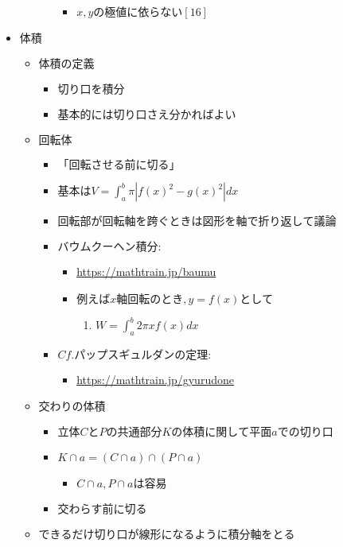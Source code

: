 \documentclass[dvipdfmx,uplatex]{jsarticle}
\begin{document}
\begin{itemize}
\begin{itemize}
\begin{itemize}
\begin{itemize}
				\item $ x,yの極値に依らない [16]$
			\end{itemize}
		\end{itemize}
	\end{itemize}
	\item $ 体積$
	\begin{itemize}
		\item $ 体積の定義$
		\begin{itemize}
			\item $ 切り口を積分$
			\item $ 基本的には切り口さえ分かればよい$
		\end{itemize}
		\item $ 回転体$
		\begin{itemize}
			\item $ 「回転させる前に切る」$
			\item $ 基本はV = \int^b_a \pi |f(x)^2 - g(x)^2|dx$
			\item $ 回転部が回転軸を跨ぐときは図形を軸で折り返して議論$
			\item $ バウムクーヘン積分: $
			\begin{itemize}
				\item \url{https://mathtrain.jp/baumu}
				\item $ 例えばx軸回転のとき,y = f(x)として$
				\begin{enumerate}
					\item $ W = \int^b_a 2\pi xf(x)dx$
				\end{enumerate}
			\end{itemize}
			\item $ Cf. パップスギュルダンの定理: $
			\begin{itemize}
				\item \url{https://mathtrain.jp/gyurudone}
			\end{itemize}
		\end{itemize}
		\item $ 交わりの体積$
		\begin{itemize}
			\item $ 立体CとPの共通部分Kの体積に関して平面aでの切り口$
			\item $ K \cap a = (C \cap a) \cap (P \cap a)$
			\begin{itemize}
				\item $ C \cap a, P \cap a は容易$
			\end{itemize}
			\item $ 交わらす前に切る$
		\end{itemize}
		\item $ できるだけ切り口が線形になるように積分軸をとる$
	\end{itemize}
\end{itemize}
\end{document}
